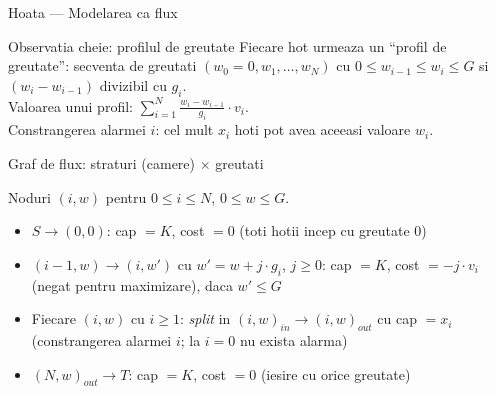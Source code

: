 ﻿\documentclass[9pt]{beamer}
\begin{document}
\begin{frame}[shrink]{Hoata --- Modelarea ca flux}
  \begin{block}{Observatia cheie: profilul de greutate}
    Fiecare hot urmeaza un ``profil de greutate'': secventa de greutati
    $(w_0{=}0, w_1, \ldots, w_N)$ cu $0\leq w_{i-1}\leq w_i\leq G$
    si $(w_i - w_{i-1})$ divizibil cu $g_i$.\\
    Valoarea unui profil: $\displaystyle\sum_{i=1}^{N}\frac{w_i - w_{i-1}}{g_i}\cdot v_i$.\\
    Constrangerea alarmei $i$: cel mult $x_i$ hoti pot avea aceeasi valoare $w_i$.
  \end{block}
  \begin{block}{Graf de flux: straturi (camere) $\times$ greutati}
    \begin{footnotesize}
    Noduri $(i, w)$ pentru $0\leq i\leq N$, $0\leq w\leq G$.\\
    \begin{itemize}
      \item $S \to (0, 0)$: cap $=K$, cost $=0$ (toti hotii incep cu greutate 0)
      \item $(i-1, w) \to (i, w')$ cu $w'=w+j\cdot g_i$, $j\geq 0$: cap $=K$,
            cost $= -j\cdot v_i$ (negat pentru maximizare), daca $w'\leq G$
      \item Fiecare $(i, w)$ cu $i\geq 1$: \textit{split} in $(i,w)_{in}\to(i,w)_{out}$ cu cap $=x_i$
            (constrangerea alarmei $i$; la $i=0$ nu exista alarma)
      \item $(N, w)_{out} \to T$: cap $=K$, cost $=0$ (iesire cu orice greutate)
    \end{itemize}
    \end{footnotesize}
  \end{block}
\end{frame}
\end{document}

